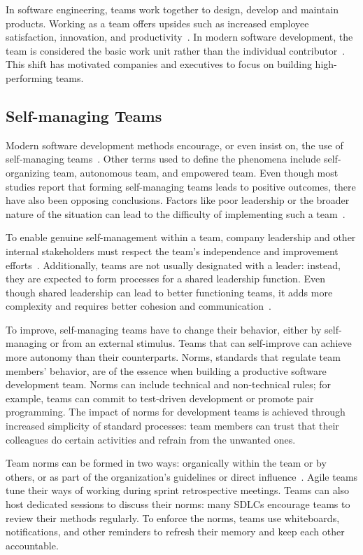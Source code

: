 In software engineering, teams work together to design, develop and maintain products. Working as a team offers upsides such as increased employee satisfaction, innovation, and productivity~\cite{moe_teamwork_2010}. In modern software development, the team is considered the basic work unit rather than the individual contributor~\cite{moe_overcoming_2010}. This shift has motivated companies and executives to focus on building high-performing teams.

\subsection{Self-managing Teams}

Modern software development methods encourage, or even insist on, the use of self-managing teams~\cite{moe_teamwork_2010,fowler_agile_2001}. Other terms used to define the phenomena include self-organizing team, autonomous team, and empowered team. Even though most studies report that forming self-managing teams leads to positive outcomes, there have also been opposing conclusions. Factors like poor leadership or the broader nature of the situation can lead to the difficulty of implementing such a team~\cite{moe_teamwork_2010}. 

To enable genuine self-management within a team, company leadership and other internal stakeholders must respect the team's independence and improvement efforts~\cite{moe_overcoming_2010}. Additionally, teams are not usually designated with a leader: instead, they are expected to form processes for a shared leadership function. Even though shared leadership can lead to better functioning teams, it adds more complexity and requires better cohesion and communication~\cite{solansky_leadership_2008}.

To improve, self-managing teams have to change their behavior, either by self-managing or from an external stimulus. Teams that can self-improve can achieve more autonomy than their counterparts. Norms, standards that regulate team members' behavior, are of the essence when building a productive software development team. Norms can include technical and non-technical rules; for example, teams can commit to test-driven development or promote pair programming. The impact of norms for development teams is achieved through increased simplicity of standard processes: team members can trust that their colleagues do certain activities and refrain from the unwanted ones.~\cite{stray_exploring_2016} 

Team norms can be formed in two ways: organically within the team or by others, or as part of the organization's guidelines or direct influence~\cite{teh_social_2012}. Agile teams tune their ways of working during sprint retrospective meetings. Teams can also host dedicated sessions to discuss their norms: many SDLCs encourage teams to review their methods regularly. To enforce the norms, teams use whiteboards, notifications, and other reminders to refresh their memory and keep each other accountable.  

